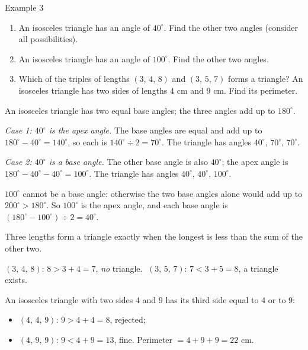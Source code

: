 \begin{exbox}{Example 3}
\begin{enumerate}[label=\alph*),leftmargin=1.6em,itemsep=0pt,topsep=2pt]
  \item An isosceles triangle has an angle of $40^\circ$. Find the other two angles (consider all possibilities).
  \item An isosceles triangle has an angle of $100^\circ$. Find the other two angles.
  \item Which of the triples of lengths $(3,\,4,\,8)$ and $(3,\,5,\,7)$ forms a triangle? An isosceles triangle has two sides of lengths $4$ cm and $9$ cm. Find its perimeter.
\end{enumerate}
\guide
{}
\begin{recallbox}An isosceles triangle has two equal base angles; the three angles add up to $180^\circ$.\end{recallbox}
\emph{Case 1: $40^\circ$ is the apex angle.} The base angles are equal and add up to $180^\circ-40^\circ=140^\circ$, so each is $140^\circ\div2=70^\circ$. The triangle has angles $40^\circ,\,70^\circ,\,70^\circ$.

\emph{Case 2: $40^\circ$ is a base angle.} The other base angle is also $40^\circ$; the apex angle is $180^\circ-40^\circ-40^\circ=100^\circ$. The triangle has angles $40^\circ,\,40^\circ,\,100^\circ$.

$100^\circ$ cannot be a base angle: otherwise the two base angles alone would add up to $200^\circ>180^\circ$. So $100^\circ$ is the apex angle, and each base angle is $(180^\circ-100^\circ)\div2=40^\circ$.

\begin{recallbox}Three lengths form a triangle exactly when the longest is less than the sum of the other two.\end{recallbox}
$(3,\,4,\,8)$: $8>3+4=7$, \emph{no} triangle. $\;(3,\,5,\,7)$: $7<3+5=8$, a triangle exists.

An isosceles triangle with two sides $4$ and $9$ has its third side equal to $4$ or to $9$:
\begin{itemize}[leftmargin=1.3em,itemsep=0pt,topsep=0pt]
  \item $(4,\,4,\,9)$: $9>4+4=8$, rejected;
  \item $(4,\,9,\,9)$: $9<4+9=13$, fine. Perimeter $=4+9+9=22$ cm.
\end{itemize}
\end{exbox}

